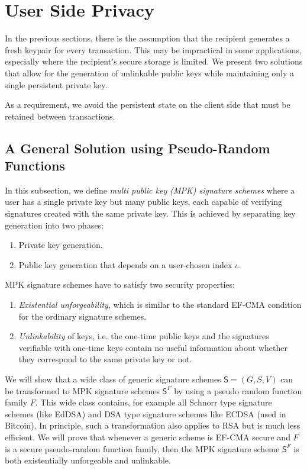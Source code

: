 \documentclass{article}
\begin{document}
\section{User Side Privacy}


In the previous sections, there is the assumption that the recipient generates a fresh keypair for every transaction. This may be impractical in some applications, especially where the recipient's secure storage is limited. We present two solutions that allow for the generation of unlinkable public keys while maintaining only a single persistent private key.

As a requirement, we avoid the persistent state on the client side that must be retained between transactions.

\subsection{A General Solution using Pseudo-Random Functions}

In this subsection, we define \emph{multi public key (MPK) signature schemes} where a user has a single private key but many public keys, each capable of verifying signatures created with the same private key. This is achieved by separating key generation into two phases:
\begin{enumerate}
\item Private key generation.
\item Public key generation that depends on a user-chosen index $\iota$.
\end{enumerate}
MPK signature schemes have to satisfy two security properties:
\begin{enumerate}
\item \emph{Existential unforgeability}, which is similar to the standard EF-CMA condition for the ordinary signature schemes.
\item \emph{Unlinkability} of keys, i.e. the one-time public keys and the signatures verifiable with one-time keys contain no useful information about whether they correspond to the same private key or not.
\end{enumerate}
We will show that a wide class of generic signature schemes $\mathsf{S}=(G,S,V)$ can
be transformed to MPK signature schemes $\mathsf{S}^F$ by using a pseudo random function family $F$. This wide class contains, for example all Schnorr type signature schemes (like EdDSA) and DSA type signature schemes like ECDSA (used in Bitcoin). In principle, such a transformation also applies to RSA but is much less efficient.
We will prove that whenever a generic scheme is EF-CMA secure and $F$ is a secure pseudo-random function family, then the MPK signature scheme $\mathsf{S}^F$ is both existentially unforgeable and unlinkable.
\end{document}
